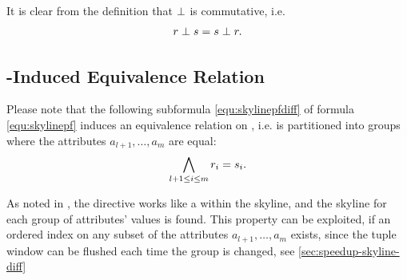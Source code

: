 \noindent
It is clear from the definition that $\perp$ is commutative, i.e.
\[
r \perp s = s \perp r.
\]


%

\subsection{-Induced Equivalence Relation}
Please note that the following subformula \eqref{equ:skylinepfdiff} of
formula \eqref{equ:skylinepf} induces an equivalence relation on
, i.e.  is partitioned into groups where the
attributes $a_{l+1}, \ldots, a_m$ are equal:
\begin{equation}\label{equ:skylinepfdiff}
\bigwedge_{l+1 \le i \le m} r_i = s_i.
\end{equation}

As noted in \citep{Chomicki2003}, the  directive works
like a  within the skyline, and the skyline for
each group of  attributes' values is found.
%
This property can be exploited, if an ordered index on any subset of
the attributes $a_{l+1}, \ldots, a_m$ exists, since the tuple window
can be flushed each time the group is changed, see
\autoref{sec:speedup-skyline-diff}

%
% 


